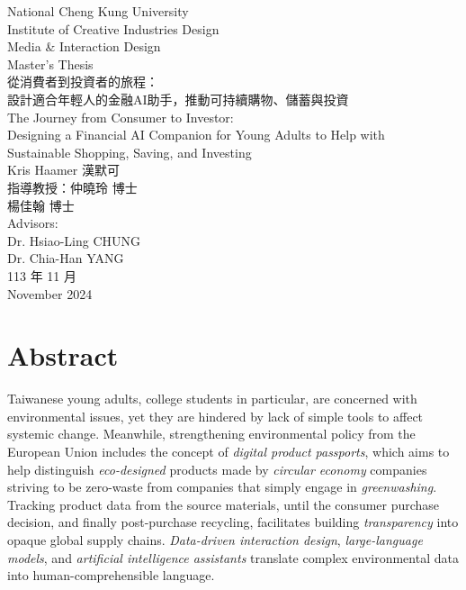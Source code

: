 \documentclass[
  letterpaper,
  DIV=11,
  numbers=noendperiod]{scrartcl}
\author{}
\date{}
\begin{document}
\begin{titlepage}
    \centering
    {\LARGE National Cheng Kung University \\}
    {\LARGE Institute of Creative Industries Design \\}
    {\LARGE Media \& Interaction Design \\}
    {\LARGE Master's Thesis \\}
    \vspace{1in}
    {\LARGE 從消費者到投資者的旅程：\\}
    {\LARGE 設計適合年輕人的金融AI助手，推動可持續購物、儲蓄與投資 \\}
    \vspace{0.5in}
    {\LARGE The Journey from Consumer to Investor: \\}
    {\LARGE Designing a Financial AI Companion for Young Adults to Help with \\}
    {\LARGE Sustainable Shopping, Saving, and Investing \\}
    \vspace{1in}
    {\Large Kris Haamer 漢默可 \\}
    \vspace{1in}
    {\Large 指導教授：仲曉玲 博士 \\ 楊佳翰 博士 \\}
    {\Large Advisors: \\}
    {\Large Dr. Hsiao-Ling CHUNG \\}
    {\Large Dr. Chia-Han YANG \\}
    \vfill
    {\Large 113 年 11 月 \\}
    {\Large November 2024 \\}
\end{titlepage}

\newpage

\section{Abstract}\label{abstract}

Taiwanese young adults, college students in particular, are concerned
with environmental issues, yet they are hindered by lack of simple tools
to affect systemic change. Meanwhile, strengthening environmental policy
from the European Union includes the concept of \emph{digital product
passports}, which aims to help distinguish \emph{eco-designed} products
made by \emph{circular economy} companies striving to be zero-waste from
companies that simply engage in \emph{greenwashing}. Tracking product
data from the source materials, until the consumer purchase decision,
and finally post-purchase recycling, facilitates building
\emph{transparency} into opaque global supply chains. \emph{Data-driven
interaction design}, \emph{large-language models}, and \emph{artificial
intelligence assistants} translate complex environmental data into
human-comprehensible language.
\end{document}
